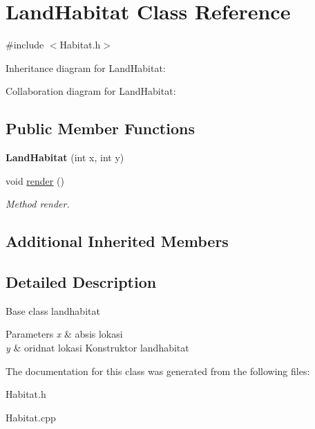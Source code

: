 \hypertarget{classLandHabitat}{}\section{Land\+Habitat Class Reference}
\label{classLandHabitat}


{\ttfamily \#include $<$Habitat.\+h$>$}



Inheritance diagram for Land\+Habitat\+:


Collaboration diagram for Land\+Habitat\+:
\subsection*{Public Member Functions}
\begin{DoxyCompactItemize}
\item 
{\bfseries Land\+Habitat} (int x, int y)\hypertarget{classLandHabitat_a2ca94610d493f3bd8b54b3b53a231536}{}\label{classLandHabitat_a2ca94610d493f3bd8b54b3b53a231536}

\item 
void \hyperlink{classLandHabitat_ad90a2fd22fa5b521d5e19e61798e3175}{render} ()\hypertarget{classLandHabitat_ad90a2fd22fa5b521d5e19e61798e3175}{}\label{classLandHabitat_ad90a2fd22fa5b521d5e19e61798e3175}

\begin{DoxyCompactList}\small\item\em Method render. \end{DoxyCompactList}\end{DoxyCompactItemize}
\subsection*{Additional Inherited Members}


\subsection{Detailed Description}
Base class landhabitat


\begin{DoxyParams}{Parameters}
{\em x} & absis lokasi \\
\hline
{\em y} & oridnat lokasi Konstruktor landhabitat \\
\hline
\end{DoxyParams}


The documentation for this class was generated from the following files\+:\begin{DoxyCompactItemize}
\item 
Habitat.\+h\item 
Habitat.\+cpp\end{DoxyCompactItemize}
